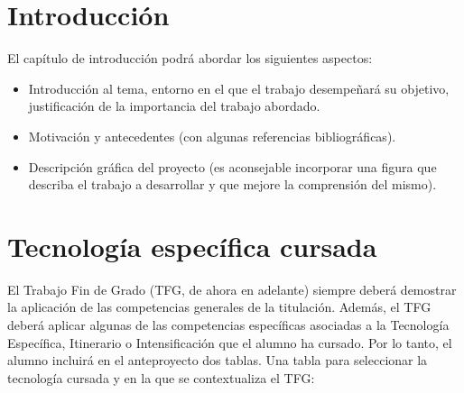 \documentclass[11pt,a4paper,twoside,final]{article}
\begin{document}
\newpage

\section{Introducción}
El capítulo de introducción podrá abordar los siguientes aspectos:
\begin{itemize}
	\item Introducción al tema, entorno en el que el trabajo desempeñará su objetivo, justificación de la importancia del trabajo abordado.

	\item Motivación y antecedentes (con algunas referencias bibliográficas).

	\item Descripción gráfica del proyecto (es aconsejable incorporar una figura que describa el trabajo a desarrollar y que mejore la comprensión del mismo).
\end{itemize}




\section{Tecnología específica cursada}
El Trabajo Fin de Grado (TFG, de ahora en adelante) siempre deberá demostrar la aplicación de las competencias generales de la titulación. Además, el TFG deberá aplicar algunas de las competencias específicas asociadas a la Tecnología Específica, Itinerario o Intensificación que el alumno ha cursado. Por lo tanto, el alumno incluirá en el anteproyecto dos tablas. Una tabla para seleccionar la tecnología cursada y en la que se contextualiza el TFG:



\end{document}
